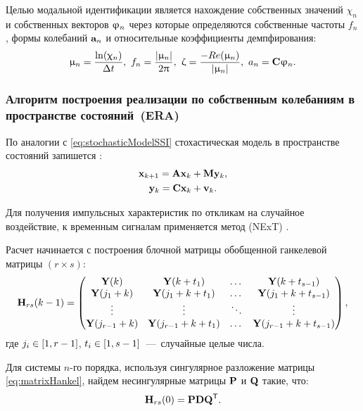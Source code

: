 Целью модальной идентификации является нахождение собственных значений $ \chi_n $ и собственных векторов $ \mathbf{\upvarphi}_n $ через которые определяются собственные частоты $ f_n $, формы колебаний $ \mathbf{a}_n $ и относительные коэффициенты демпфирования:
\begin{equation}
	\upmu_n = \frac{\ln(\upchi_n)}{\Delta t}, \ f_n = \frac{|\upmu_n|}{2 \uppi}, \ \upzeta = \frac{-Re(\upmu_n)}{|\upmu_n|}, \ a_n = \mathbf{C} \mathbf{\upvarphi}_n.
\end{equation}

\subsubsection{Алгоритм построения реализации по собственным колебаниям в пространстве состояний~(ERA)}

По аналогии с \eqref{eq:stochasticModelSSI} стохастическая модель в пространстве состояний запишется \cite{lib:oma:Juang}:
\begin{gather}
	\mathbf{x}_{k + 1} = \mathbf{A} \mathbf{x}_k + \mathbf{M} \mathbf{y}_k, \\
	\mathbf{y}_k = \mathbf{C} \mathbf{x}_k + \mathbf{v}_k.
\end{gather}

Для получения импульсных характеристик по откликам на случайное воздействие, к временным сигналам применяется метод  (NExT) \cite{lib:oma:Lin}. 

Расчет начинается с построения блочной матрицы обобщенной ганкелевой матрицы $ (r \times s) $:
\begin{equation}
	\mathbf{H}_{rs}(k - 1) = 
	\begin{pmatrix}
		\mathbf{Y}(k) & \mathbf{Y}(k + t_1) & \dots & \mathbf{Y}(k + t_{s - 1}) \\
		\mathbf{Y}(j_1 + k) & \mathbf{Y}(j_1 + k + t_1) & \dots & \mathbf{Y}(j_1 + k + t_{s - 1}) \\
		\vdots & \vdots & \ddots & \vdots \\
		\mathbf{Y}(j_{r - 1} + k) & \mathbf{Y}(j_{r - 1} + k + t_1) & \dots & \mathbf{Y}(j_{r - 1} + k + t_{s - 1})
	\end{pmatrix}, \label{eq:matrixHankel}
\end{equation}
где $j_i \in \left[ 1, r - 1 \right] $, $ t_i \in \left[ 1, s - 1 \right]$~---~случайные целые числа.

Для системы $ n $-го порядка, используя сингулярное разложение матрицы \eqref{eq:matrixHankel}, найдем несингулярные матрицы $ \mathbf{P} $ и $ \mathbf{Q} $ такие, что:
\begin{equation}
	\mathbf{H}_{rs}(0) = \mathbf{P} \mathbf{D} \mathbf{Q} ^ \mathsf{T}.
\end{equation}

